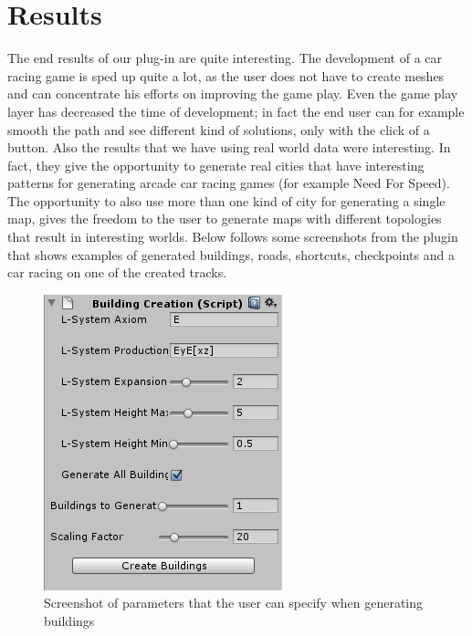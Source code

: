 \documentclass[conference]{IEEEtran}
\begin{document}
\section{Results}

The end results of our plug-in are quite interesting. The development of a car racing game is sped up quite a lot, as the user does not have to create meshes and can concentrate his efforts on improving the game play. Even the game play layer has decreased the time of development; in fact the end user can for example smooth the path and see different kind of solutions, only with the click of a button.\newline\newline
Also the results that we have using real world data were interesting.  In fact, they give the opportunity to generate real cities that have interesting patterns for generating arcade car racing games (for example Need For Speed). The opportunity to also use more than one kind of city for generating a single map, gives the freedom to the user to generate maps with different topologies that result in interesting worlds. Below follows some screenshots from the plugin that shows examples of generated buildings, roads, shortcuts, checkpoints and a car racing on one of the created tracks.

\begin{figure}[h!t]
\centering
\includegraphics[scale=0.8]{images/BuildingScript.png}
\caption{\label{buildings} Screenshot of parameters that the user can specify when generating buildings}
\end{figure}
\end{document}
